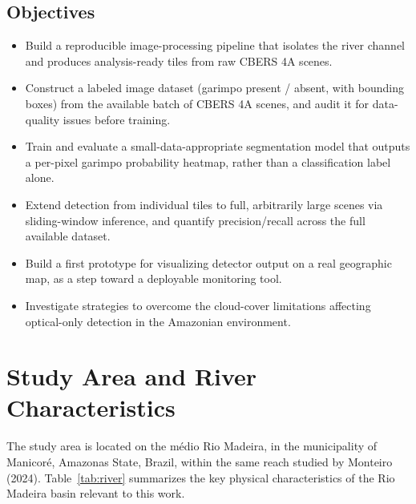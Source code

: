 \documentclass[11pt,a4paper]{article}
\begin{document}
\subsection{Objectives}
\begin{itemize}[nosep]
  \item Build a reproducible image-processing pipeline that isolates the
        river channel and produces analysis-ready tiles from raw CBERS 4A
        scenes.
  \item Construct a labeled image dataset (garimpo present / absent, with
        bounding boxes) from the available batch of CBERS 4A scenes, and
        audit it for data-quality issues before training.
  \item Train and evaluate a small-data-appropriate segmentation model that
        outputs a per-pixel garimpo probability heatmap, rather than a
        classification label alone.
  \item Extend detection from individual tiles to full, arbitrarily large
        scenes via sliding-window inference, and quantify precision/recall
        across the full available dataset.
  \item Build a first prototype for visualizing detector output on a real
        geographic map, as a step toward a deployable monitoring tool.
  \item Investigate strategies to overcome the cloud-cover limitations 
        affecting optical-only detection in the Amazonian environment.
\end{itemize}

\section{Study Area and River Characteristics}

The study area is located on the m\'edio Rio Madeira, in the municipality of
Manicor\'e, Amazonas State, Brazil, within the same reach studied by Monteiro
(2024). Table~\ref{tab:river} summarizes the key physical characteristics of
the Rio Madeira basin relevant to this work.
\end{document}

